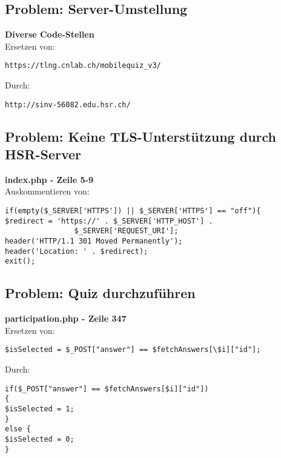 
\subsection{Problem: Server-Umstellung}

\textbf{Diverse Code-Stellen} \\

\noindent Ersetzen von:
\begin{lstlisting}[backgroundcolor = \color{lightgray}]
https://tlng.cnlab.ch/mobilequiz_v3/
\end{lstlisting}

\bigskip
\noindent Durch:
\begin{lstlisting}[backgroundcolor = \color{lightgray}]
http://sinv-56082.edu.hsr.ch/
\end{lstlisting}



\subsection{Problem: Keine TLS-Unterstützung durch HSR-Server}

\textbf{index.php - Zeile 5-9} \\

\noindent Auskommentieren von:
\begin{lstlisting}[backgroundcolor = \color{lightgray}]
if(empty($_SERVER['HTTPS']) || $_SERVER['HTTPS'] == "off"){
$redirect = 'https://' . $_SERVER['HTTP_HOST'] . 
				$_SERVER['REQUEST_URI'];
header('HTTP/1.1 301 Moved Permanently');
header('Location: ' . $redirect);
exit();
\end{lstlisting}



\subsection{Problem: Quiz durchzuführen}

\textbf{participation.php - Zeile 347} \\

\noindent Ersetzen von:
\begin{lstlisting}[backgroundcolor = \color{lightgray}]
$isSelected = $_POST["answer"] == $fetchAnswers[\$i]["id"];
\end{lstlisting}

\bigskip
\noindent Durch:
\begin{lstlisting}[backgroundcolor = \color{lightgray}]
if($_POST["answer"] == $fetchAnswers[$i]["id"])
{ 
$isSelected = 1; 
} 
else { 
$isSelected = 0; 
}
\end{lstlisting}



